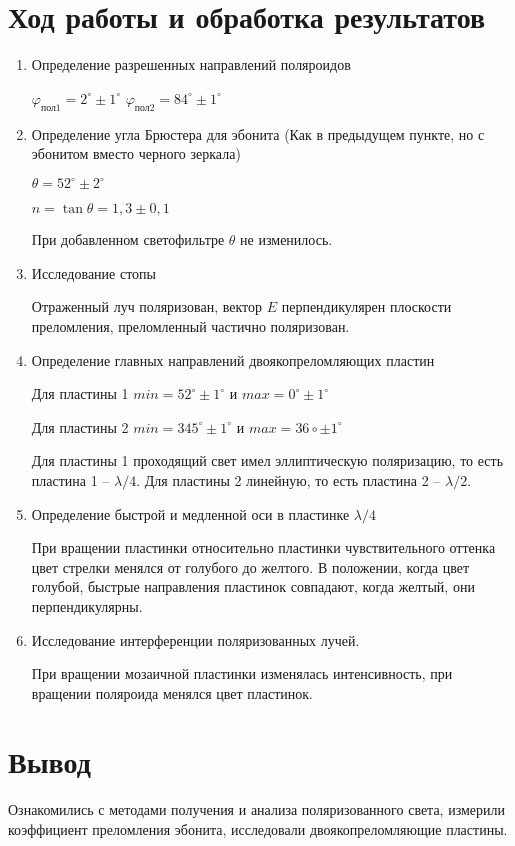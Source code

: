 \documentclass{letask}
\begin{document}
\section{Ход работы и обработка результатов}

\begin{enumerate}
\item Определение разрешенных направлений поляроидов 

$\varphi_{\text{пол}1} = 2^\circ \pm 1^\circ$
\hspace{5cm}
$\varphi_{\text{пол}2} = 84^\circ \pm 1^\circ$


\item Определение угла Брюстера для эбонита (Как в предыдущем пункте, но с эбонитом вместо черного зеркала)

$\theta = 52^\circ \pm 2^\circ$

$ n = \tan{\theta} = 1,3 \pm 0,1 $

При добавленном светофильтре $\theta$ не изменилось.

\item Исследование стопы

Отраженный луч поляризован, вектор $E$ перпендикулярен плоскости преломления, преломленный частично поляризован.

\item Определение главных направлений двоякопреломляющих пластин 

Для пластины 1 $min = 52^\circ \pm 1^\circ$ и $max = 0^\circ \pm 1^\circ$

Для пластины 2 $min = 345^\circ \pm 1^\circ$ и $max = 36\circ \pm 1^\circ$

Для пластины 1 проходящий свет имел эллиптическую поляризацию, то есть пластина 1 -- $\lambda/4$. Для пластины 2 линейную, то есть пластина 2 --  $\lambda/2$.

\item Определение быстрой и медленной оси в пластинке $\lambda/4$


При вращении пластинки относительно пластинки чувствительного оттенка цвет стрелки менялся от голубого до желтого. В положении, когда цвет голубой, быстрые направления пластинок совпадают, когда желтый, они перпендикулярны.

\item Исследование интерференции поляризованных лучей.

При вращении мозаичной пластинки изменялась интенсивность, при вращении поляроида менялся цвет пластинок.

\end{enumerate}

\section{Вывод}
Ознакомились с методами получения и анализа поляризованного света, измерили коэффициент преломления эбонита, исследовали двоякопреломляющие пластины.
\end{document}
